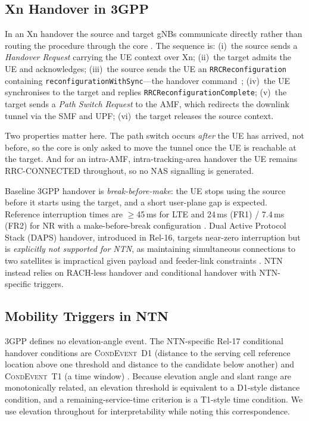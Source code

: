 \documentclass[conference]{IEEEtran}
\begin{document}
\subsection{Xn Handover in 3GPP}

In an Xn handover the source and target gNBs communicate directly rather than
routing the procedure through the core \cite{ref_38300}. The sequence is:
(i)~the source sends a \emph{Handover Request} carrying the UE context over Xn;
(ii)~the target admits the UE and acknowledges; (iii)~the source sends the UE an
\texttt{RRCReconfiguration} containing \texttt{reconfigurationWithSync}---the
handover command~\cite{ref_38331}; (iv)~the UE synchronises to the target and
replies
\texttt{RRCReconfigurationComplete}; (v)~the target sends a \emph{Path Switch
Request} to the AMF, which redirects the downlink tunnel via the SMF and UPF;
(vi)~the target releases the source context.

Two properties matter here. The path switch occurs \emph{after} the UE has
arrived, not before, so the core is only asked to move the tunnel once the UE is
reachable at the target. And for an intra-AMF, intra-tracking-area handover the
UE remains RRC-CONNECTED throughout, so no NAS signalling is generated.

Baseline 3GPP handover is \emph{break-before-make}: the UE stops using the
source before it starts using the target, and a short user-plane gap is
expected. Reference interruption times are $\geq$45\,ms for LTE and 24\,ms
(FR1) / 7.4\,ms (FR2) for NR with a make-before-break configuration
\cite{ref_daps}. Dual Active Protocol Stack (DAPS) handover, introduced in
Rel-16, targets near-zero interruption but is \emph{explicitly not supported for
NTN}, as maintaining simultaneous connections to two satellites is impractical
given payload and feeder-link constraints \cite{ref_ntnproc}. NTN instead relies
on RACH-less handover and conditional handover with NTN-specific triggers.

\subsection{Mobility Triggers in NTN}

3GPP defines no elevation-angle event. The NTN-specific Rel-17 conditional
handover conditions are \textsc{CondEvent~D1} (distance to the serving cell
reference location above one threshold and distance to the candidate below
another) and \textsc{CondEvent~T1} (a time window) \cite{ref_ntnproc}. Because
elevation angle and slant range are monotonically related, an elevation
threshold is equivalent to a D1-style distance condition, and a
remaining-service-time criterion is a T1-style time condition. We use elevation
throughout for interpretability while noting this correspondence.
\end{document}
